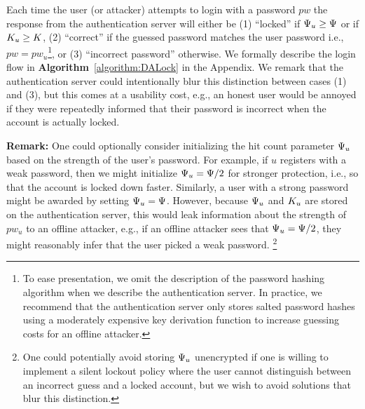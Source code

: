 Each time the user (or attacker) attempts to login with a password $pw$ the response from the authentication server will either be (1) ``locked'' if $\Psi_{u} \geq \Psi$ or if $K_{u} \geq K$, (2) ``correct'' if the guessed password matches the user password i.e., $pw = pw_u$\footnote{To ease presentation, we omit the description of the password hashing algorithm when we describe the authentication server. In practice, we recommend that the authentication server only stores salted password hashes using a moderately expensive key derivation function to increase guessing costs for an offline attacker.}, or (3) ``incorrect password'' otherwise. We formally describe the login flow in \textbf{Algorithm}~\ref{algorithm:DALock} in the Appendix. We remark that the authentication server could intentionally blur this distinction between cases (1) and (3), but this comes at a usability cost, e.g., an honest user would be annoyed if they were repeatedly informed that their password is incorrect when the account is actually locked.

{\noindent \bf Remark:} One could optionally consider initializing the hit count parameter $\Psi_{u}$ based on the strength of the user's password. For example, if $u$ registers with a weak password, then we might initialize $\Psi_{u} = \Psi/2$ for stronger protection, i.e., so that the account is locked down faster. Similarly, a user with a strong password might be awarded by setting $\Psi_{u} = \Psi$. However, because $\Psi_{u}$ and $K_{u}$ are stored on the authentication server, this would leak information about the strength of $pw_u$ to an offline attacker, e.g., if an offline attacker sees that $\Psi_{u} = \Psi/2$, they might reasonably infer that the user picked a weak password. \footnote{One could potentially avoid storing $\Psi_{u}$ unencrypted if one is willing to implement a silent lockout policy where the user cannot distinguish between an incorrect guess and a locked account, but we wish to avoid solutions that blur this distinction.}  




